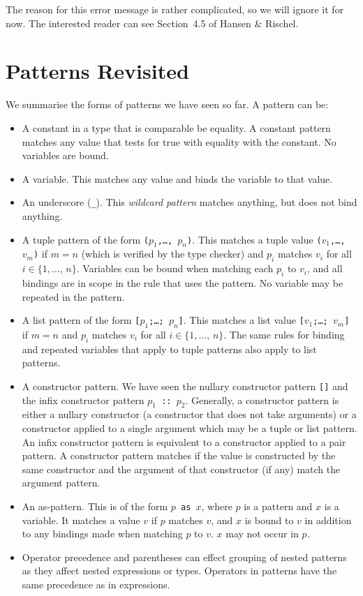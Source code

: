 \documentclass[a4paper]{article}
\begin{document}
\noindent
The reason for this error message is rather complicated, so we will
ignore it for now.  The interested reader can see Section~4.5 of
Hansen \& Rischel.

\section{Patterns Revisited}

We summarise the forms of patterns we have seen so far.  A pattern can
be:

\begin{itemize}
\item A constant in a type that is comparable be equality.  A constant
  pattern matches any value that tests for true with equality with the
  constant.  No variables are bound.
\item A variable.  This matches any value and binds the variable to
  that value.
\item An underscore (\verb|_|).  This \emph{wildcard pattern} matches
  anything, but does not bind anything.
\item A tuple pattern of the form \texttt{($p_1$,\ldots,\,$p_n$)}.
  This matches a tuple value \texttt{($v_1$,\ldots,\,$v_m$)} if $m=n$
  (which is verified by the type checker) and $p_i$ matches $v_i$ for
  all $i\in\{1,\ldots,\,n\}$.  Variables can be bound when matching
  each $p_i$ to $v_i$, and all bindings are in scope in the rule that
  uses the pattern.  No variable may be repeated in the pattern.
\item A list pattern of the form \texttt{[$p_1$;\ldots;\,$p_n$]}.
  This matches a list value \texttt{[$v_1$;\ldots;\,$v_m$]} if $m=n$
  and $p_i$ matches $v_i$ for all $i\in\{1,\ldots,\,n\}$.  The same
  rules for binding and repeated variables that apply to tuple
  patterns also apply to list patterns.
\item A constructor pattern.  We have seen the nullary constructor
  pattern \texttt{[]} and the infix constructor pattern \texttt{$p_1$
    :: $p_2$}.  Generally, a constructor pattern is either a nullary
  constructor (a constructor that does not take arguments) or a
  constructor applied to a single argument which may be a tuple or
  list pattern.  An infix constructor pattern is equivalent to a
  constructor applied to a pair pattern.  A constructor pattern
  matches if the value is constructed by the same constructor and the
  argument of that constructor (if any) match the argument pattern.
\item An as-pattern.  This is of the form \texttt{$p$ as $x$}, where
  $p$ is a pattern and $x$ is a variable.  It matches a value $v$ if
  $p$ matches $v$, and $x$ is bound to $v$ in addition to any bindings
  made when matching $p$ to $v$.  $x$ may not occur in $p$.
\item Operator precedence and parentheses can effect grouping of
  nested patterns as they affect nested expressions or types.
  Operators in patterns have the same precedence as in expressions.
\end{itemize}
\end{document}
